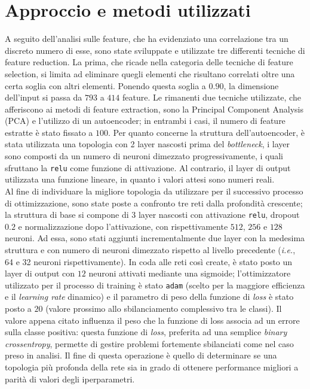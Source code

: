 \section{Approccio e metodi utilizzati}
A seguito dell'analisi sulle feature, che ha evidenziato una correlazione tra un discreto numero di esse, sono state sviluppate e utilizzate tre differenti tecniche di feature reduction. 
La prima, che ricade nella categoria delle tecniche di feature selection, si limita ad eliminare quegli elementi che risultano correlati oltre una certa soglia con altri elementi. 
Ponendo questa soglia a $0.90$, la dimensione dell'input si passa da $793$ a $414$ feature.
Le rimanenti due tecniche utilizzate, che afferiscono ai metodi di feature extraction, sono la Principal Component Analysis (PCA) e l'utilizzo di un autoencoder; in entrambi i casi, il numero di feature estratte è stato fissato a $100$.
Per quanto concerne la struttura dell'autoencoder, è stata utilizzata una topologia con 2 layer nascosti prima del \textit{bottleneck}, i layer sono composti da un numero di neuroni dimezzato progressivamente, i quali sfruttano la \texttt{relu} come funzione di attivazione. 
Al contrario, il layer di output utilizzata una funzione lineare, in quanto i valori attesi sono numeri reali.\\
Al fine di individuare la migliore topologia da utilizzare per il successivo processo di ottimizzazione, sono state poste a confronto tre reti dalla profondità crescente; la struttura di base si compone di $3$ layer nascosti con attivazione \texttt{relu}, dropout $0.2$ e normalizzazione dopo l'attivazione, con rispettivamente $512$, $256$ e $128$ neuroni. 
Ad essa, sono stati aggiunti incrementalmente due layer con la medesima struttura e con numero di neuroni dimezzato rispetto al livello precedente (\textit{i.e.}, 64 e 32 neuroni rispettivamente). 
In coda alle reti così create, è stato posto un layer di output con $12$ neuroni attivati mediante una sigmoide; l'ottimizzatore utilizzato per il processo di training è stato \texttt{adam} (scelto per la maggiore efficienza e il \textit{learning rate} dinamico) e il parametro di peso della funzione di \textit{loss} è stato posto a $20$ (valore prossimo allo sbilanciamento complessivo tra le classi). Il valore appena citato influenza il peso che la funzione di loss associa ad un errore sulla classe positiva: questa funzione di \textit{loss}, preferita ad una semplice \textit{binary crossentropy}, permette di gestire problemi fortemente sbilanciati come nel caso preso in analisi.
Il fine di questa operazione è quello di determinare se una topologia più profonda della rete sia in grado di ottenere performance migliori a parità di valori degli iperparametri.

